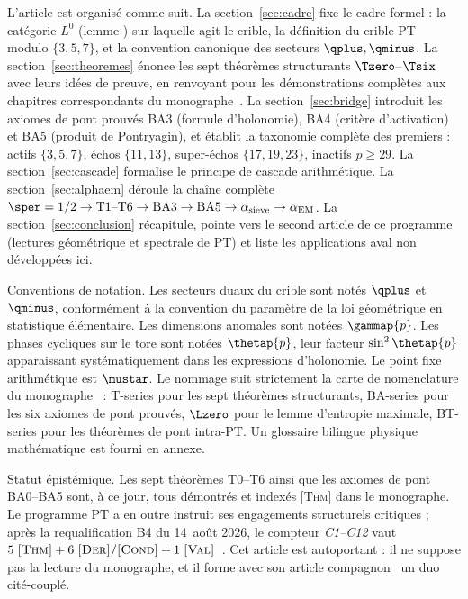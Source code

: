 L'article est organisé comme suit. La section~\ref{sec:cadre} fixe le cadre formel : la catégorie $L^0$ (lemme \Lzero) sur laquelle agit le crible, la définition du crible PT modulo $\{3,5,7\}$, et la convention canonique des secteurs $\qplus, \qminus$. La section~\ref{sec:theoremes} énonce les sept théorèmes structurants $\Tzero$--$\Tsix$ avec leurs idées de preuve, en renvoyant pour les démonstrations complètes aux chapitres correspondants du monographe~\cite{PT_Monograph}. La section~\ref{sec:bridge} introduit les axiomes de pont prouvés BA3 (formule d'holonomie), BA4 (critère d'activation) et BA5 (produit de Pontryagin), et établit la taxonomie complète des premiers : actifs $\{3,5,7\}$, échos $\{11,13\}$, super-échos $\{17,19,23\}$, inactifs $p \geq 29$. La section~\ref{sec:cascade} formalise le principe de cascade arithmétique. La section~\ref{sec:alphaem} déroule la chaîne complète $\sper=1/2 \to \text{T1--T6} \to \text{BA3} \to \text{BA5} \to \alpha_{\rm sieve} \to \alpha_{\mathrm{EM}}$. La section~\ref{sec:conclusion} récapitule, pointe vers le second article de ce programme (lectures géométrique et spectrale de PT) et liste les applications aval non développées ici.

Conventions de notation. Les secteurs duaux du crible sont notés $\qplus$ et $\qminus$, conformément à la convention du paramètre de la loi géométrique en statistique élémentaire. Les dimensions anomales sont notées $\gammap{p}$. Les phases cycliques sur le tore sont notées $\thetap{p}$, leur facteur $\sin^2 \thetap{p}$ apparaissant systématiquement dans les expressions d'holonomie. Le point fixe arithmétique est $\mustar$. Le nommage suit strictement la carte de nomenclature du monographe~\cite{PT_Monograph} : T-series pour les sept théorèmes structurants, BA-series pour les six axiomes de pont prouvés, $\Lzero$ pour le lemme d'entropie maximale, BT-series pour les théorèmes de pont intra-PT. Un glossaire bilingue physique\,\textendash\,mathématique est fourni en annexe.

Statut épistémique. Les sept théorèmes T0--T6 ainsi que les axiomes de pont BA0--BA5 sont, à ce jour, tous démontrés et indexés \textsc{[Thm]} dans le monographe. Le programme PT a en outre instruit ses engagements structurels critiques ; après la requalification B4 du 14~août 2026, le compteur \emph{C1--C12} vaut $5\;\textsc{[Thm]} + 6\;\textsc{[Der]}/\textsc{[Cond]} + 1\;\textsc{[Val]}$~\cite{PT_Monograph}. Cet article est autoportant : il ne suppose pas la lecture du monographe, et il forme avec son article compagnon~\cite{PT_Article2_GeoSpectral} un duo cité-couplé.
